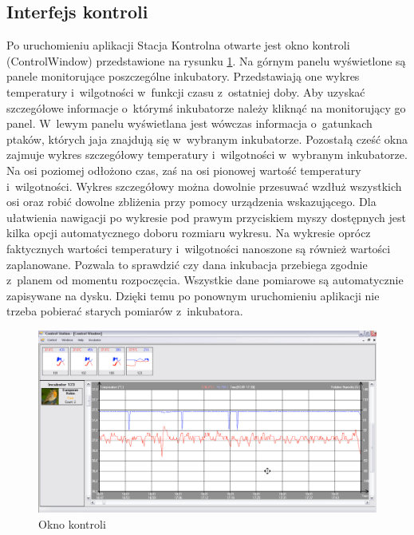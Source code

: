 \subsection{Interfejs kontroli}
Po uruchomieniu aplikacji Stacja Kontrolna otwarte jest okno kontroli
(ControlWindow) przedstawione na rysunku \ref{rys:Control}. Na górnym panelu
wyświetlone są panele monitorujące poszczególne inkubatory. Przedstawiają one
wykres temperatury i~wilgotności w~funkcji czasu z~ostatniej doby. Aby uzyskać
szczegółowe informacje o~którymś inkubatorze należy kliknąć na monitorujący go
panel. W~lewym panelu wyświetlana jest wówczas informacja o~gatunkach ptaków,
których jaja znajdują się w~wybranym inkubatorze. Pozostałą cześć okna zajmuje
wykres szczegółowy temperatury i~wilgotności w~wybranym inkubatorze. Na osi
poziomej odłożono czas, zaś na osi pionowej wartość temperatury i~wilgotności.
Wykres szczegółowy można dowolnie przesuwać wzdłuż wszystkich osi oraz robić
dowolne zbliżenia przy pomocy urządzenia wskazującego. Dla ułatwienia nawigacji
po wykresie pod prawym przyciskiem myszy dostępnych jest kilka opcji
automatycznego doboru rozmiaru wykresu. Na wykresie oprócz faktycznych wartości
temperatury i~wilgotności nanoszone są również wartości zaplanowane. Pozwala to
sprawdzić czy dana inkubacja przebiega zgodnie z~planem od momentu rozpoczęcia.
Wszystkie dane pomiarowe są automatycznie zapisywane na dysku. Dzięki temu po
ponownym uruchomieniu aplikacji nie trzeba pobierać starych pomiarów
z~inkubatora.

\begin{figure}[p] 
\centering\includegraphics[width=\textwidth]{figures/Control}
\caption{Okno kontroli}\label{rys:Control}
\end{figure}

